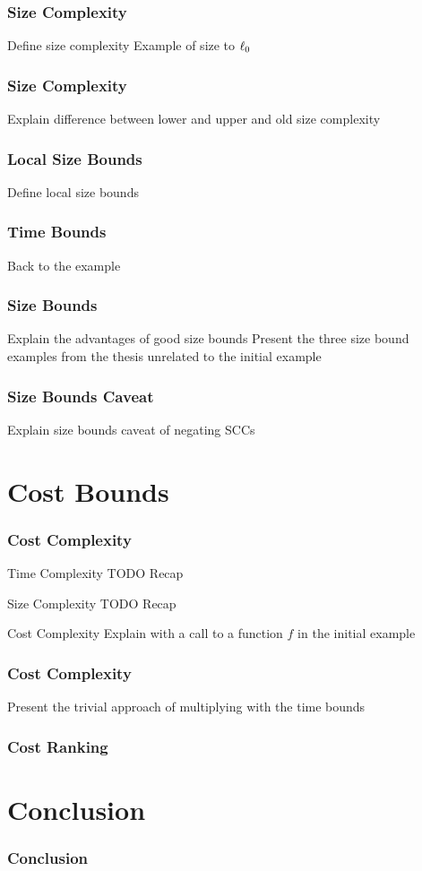 \documentclass{beamer}
\begin{document}
\begin{frame}
  \frametitle{Size Complexity}
  Define size complexity
  Example of size to $\ell_0$
\end{frame}

\begin{frame}
  \frametitle{Size Complexity}
  Explain difference between lower and upper and old size complexity
\end{frame}

\begin{frame}
  \frametitle{Local Size Bounds}
  Define local size bounds
\end{frame}

\begin{frame}
  \frametitle{Time Bounds}
  Back to the example
\end{frame}

\begin{frame}
  \frametitle{Size Bounds}
  Explain the advantages of good size bounds
  Present the three size bound examples from the thesis unrelated to the initial example
\end{frame}

\begin{frame}
  \frametitle{Size Bounds Caveat}
  Explain size bounds caveat of negating SCCs
\end{frame}

\section{Cost Bounds}

\begin{frame}
  \frametitle{Cost Complexity}
  \begin{block}{Time Complexity}
    TODO Recap
  \end{block}
  \pause
  \begin{block}{Size Complexity}
    TODO Recap
  \end{block}
  \pause
  \begin{block}{Cost Complexity}
    Explain with a call to a function $f$ in the initial example 
  \end{block}
\end{frame}

\begin{frame}
  \frametitle{Cost Complexity}
  Present the trivial approach of multiplying with the time bounds
\end{frame}

\begin{frame}
  \frametitle{Cost Ranking}
\end{frame}

\section{Conclusion}

\begin{frame}
  \frametitle{Conclusion}
\end{frame}
\end{document}
